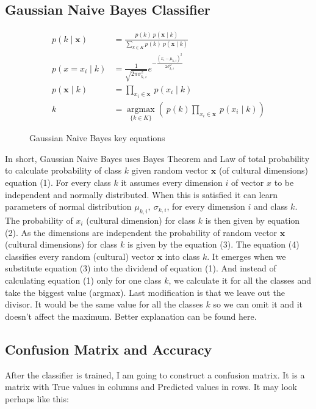 \documentclass[a4paper,10pt]{article}
\begin{document}
\subsection{Gaussian Naive Bayes Classifier}

\begin{figure}[H]
    \begin{align}
    p(k \mid \mathbf{x}) &= {\frac {p(k)\ p(\mathbf{x} \mid k)}{\sum_{k\in K}p(k)\ p(\mathbf{x} \mid k)}} \\
    p(x=x_i \mid k) &={\frac {1}{\sqrt {2\pi \sigma_{k,i}^{2}}}} e^{- \frac{(x_i - \mu_{k,i})^2}{2\sigma _{k,i}^2}} \\
    p(\mathbf{x} \mid k) &= \prod_{x_i \in \mathbf{x}}\ p(x_{i} \mid k) \\
    k &= \underset{\{k\in K\}}{\operatorname{argmax}}\left(\ p(k) \prod_{x_i \in \mathbf{x}}\ p(x_{i} \mid k)\right)
    \end{align}
    \caption{Gaussian Naive Bayes key equations}
    \label{bayes}
\end{figure}

In short, Gaussian Naive Bayes uses Bayes Theorem and Law of total probability to calculate probability of class $k$ given random vector $\mathbf{x}$ (of cultural dimensions) equation (1).
For every class $k$ it assumes every dimension $i$ of vector $x$ to be independent and normally distributed.
When this is satisfied it can learn parameters of normal distribution $\mu_{k,i},\ \sigma_{k,i}$, for every dimension $i$ and class $k$.
The probability of $x_i$ (cultural dimension) for class $k$ is then given by equation (2).
As the dimensions are independent the probability of random vector $\mathbf{x}$ (cultural dimensions) for class $k$ is given by the equation (3).
The equation (4) classifies every random (cultural) vector $\mathbf{x}$ into class $k$.
It emerges when we substitute equation (3) into the dividend of equation (1).
And instead of calculating equation (1) only for one class $k$, we calculate it for all the classes and take the biggest value (argmax).
Last modification is that we leave out the divisor.
It would be the same value for all the classes $k$ so we can omit it and it doesn't affect the maximum.
Better explanation can be found here\cite{cornellBayes}.

\subsection{Confusion Matrix and Accuracy}

After the classifier is trained, I am going to construct a confusion matrix.
It is a matrix with True values in columns and Predicted values in rows.
It may look perhaps like this:
\end{document}
